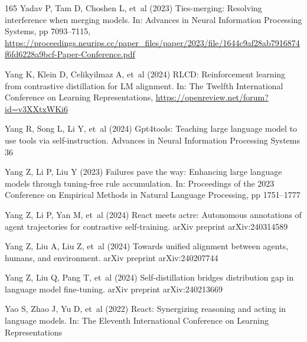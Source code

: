 \documentclass[sn-basic, Numbered]{sn-jnl}%
\theoremstyle{thmstyleone}%
\theoremstyle{thmstyletwo}%
\theoremstyle{thmstylethree}%
\begin{document}
\begin{thebibliography}{165}
Yadav P, Tam D, Choshen L, et~al (2023) Ties-merging: Resolving interference when merging models. In: Advances in Neural Information Processing Systems, pp 7093--7115, \urlprefix\url{https://proceedings.neurips.cc/paper_files/paper/2023/file/1644c9af28ab7916874f6fd6228a9bcf-Paper-Conference.pdf}

Yang K, Klein D, Celikyilmaz A, et~al (2024{}) {RLCD}: Reinforcement learning from contrastive distillation for {LM} alignment. In: The Twelfth International Conference on Learning Representations, \urlprefix\url{https://openreview.net/forum?id=v3XXtxWKi6}

Yang R, Song L, Li Y, et~al (2024{}) Gpt4tools: Teaching large language model to use tools via self-instruction. Advances in Neural Information Processing Systems 36

Yang Z, Li P, Liu Y (2023) Failures pave the way: Enhancing large language models through tuning-free rule accumulation. In: Proceedings of the 2023 Conference on Empirical Methods in Natural Language Processing, pp 1751--1777

Yang Z, Li P, Yan M, et~al (2024{}) React meets actre: Autonomous annotations of agent trajectories for contrastive self-training. arXiv preprint arXiv:240314589

Yang Z, Liu A, Liu Z, et~al (2024{}) Towards unified alignment between agents, humans, and environment. arXiv preprint arXiv:240207744

Yang Z, Liu Q, Pang T, et~al (2024{}) Self-distillation bridges distribution gap in language model fine-tuning. arXiv preprint arXiv:240213669

Yao S, Zhao J, Yu D, et~al (2022) React: Synergizing reasoning and acting in language models. In: The Eleventh International Conference on Learning Representations


\end{thebibliography}
\end{document}
